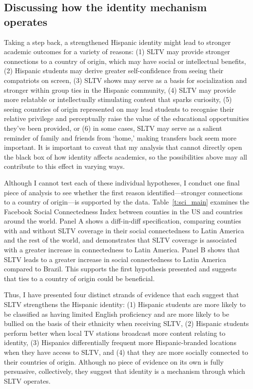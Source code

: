 \documentclass[11pt]{article}
\begin{document}
\subsection{Discussing how the identity mechanism operates}

Taking a step back, a strengthened Hispanic identity might lead to stronger academic outcomes for a variety of reasons: (1) SLTV may provide stronger connections to a country of origin, which may have social or intellectual benefits, (2) Hispanic students may derive greater self-confidence from seeing their compatriots on screen, (3) SLTV shows may serve as a basis for socialization and stronger within group ties in the Hispanic community, (4) SLTV may provide more relatable or intellectually stimulating content that sparks curiosity, (5) seeing countries of origin represented on may lead students to recognise their relative privilege and perceptually raise the value of the educational opportunities they've been provided, or (6) in some cases, SLTV may serve as a salient reminder of family and friends from `home,' making transfers back seem more important. It is important to caveat that my analysis that cannot directly open the black box of how identity affects academics, so the possibilities above may all contribute to this effect in varying ways. 

Although I cannot test each of these individual hypotheses, I conduct one final piece of analysis to see whether the first reason identified---stronger connections to a country of origin---is supported by the data. Table~\ref{t:sci_main} examines the Facebook Social Connectedness Index between counties in the US and countries around the world. Panel A shows a diff-in-diff specification, comparing counties with and without SLTV coverage in their social connectedness to Latin America and the rest of the world, and demonstrates that SLTV coverage is associated with a greater increase in connectedness to Latin America. Panel B shows that SLTV leads to a greater increase in social connectedness to Latin America compared to Brazil. This supports the first hypothesis presented and suggests that ties to a country of origin could be beneficial.

Thus, I have presented four distinct strands of evidence that each suggest that SLTV strengthens the Hispanic identity: (1) Hispanic students are more likely to be classified as having limited English proficiency and are more likely to be bullied on the basis of their ethnicity when receiving SLTV, (2) Hispanic students perform better when local TV stations broadcast more content relating to identity, (3) Hispanics differentially frequent more Hispanic-branded locations when they have access to SLTV, and (4) that they are more socially connected to their countries of origin. Although no piece of evidence on its own is fully persuasive, collectively, they suggest that identity is a mechanism through which SLTV operates.
\end{document}
